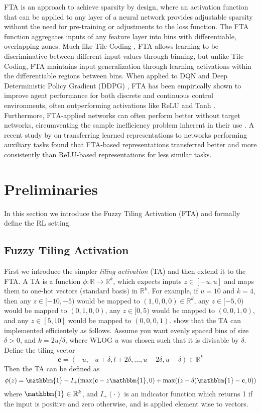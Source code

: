 \documentclass{article}
\newcommand{\RR}{\mathbb{R}}
\begin{document}
FTA is an approach to achieve sparsity by design, 
where an activation function that can be applied to any layer of a neural network provides adjustable sparsity without the need for pre-training or adjustments to the loss function. 
The FTA function aggregates inputs of any feature layer into bins with differentiable, overlapping zones. Much like Tile Coding \cite[]{tilecoding}, 
FTA allows learning to be discriminative between different input values through binning, but unlike Tile Coding, 
FTA maintains input generalization through learning activations within the differentiable regions between bins. 
When applied to DQN and Deep Deterministic Policy Gradient (DDPG) \cite[]{ddpg}, 
FTA has been empirically shown to improve agent performance for both discrete and continuous control environments, 
often outperforming activations like ReLU and Tanh \cite[]{pan2019fuzzy}. Furthermore, FTA-applied networks can often perform better without target networks, 
circumventing the sample inefficiency problem inherent in their use \cite[]{pan2019fuzzy}. 
A recent study by \cite{nnrep} on transferring learned representations to networks performing auxiliary tasks found that FTA-based representations 
transferred better and more consistently than ReLU-based representations for less similar tasks.

\section{Preliminaries} \label{sec:prelims}
In this section we introduce the Fuzzy Tiling Activation (FTA) and formally define the RL setting.

\subsection{Fuzzy Tiling Activation}
First we introduce the simpler \textit{tiling activation} (TA) and then extend it to the FTA.
A TA is a function $\phi: \RR \to \RR^k$, which expects inputs $z \in [-u, u]$ and maps them to one-hot vectors (standard basis) in $\RR^k$.
For example, if $u=10$ and $k=4$, then any $z \in [-10,-5)$ would be mapped to $(1, 0 ,0, 0) \in \RR^k$, any $z \in [-5, 0)$ would be mapped to $(0, 1, 0, 0)$, any $z \in [0, 5)$ would be mapped to $(0, 0, 1, 0)$, and any $z \in [5, 10]$ would be mapped to $(0, 0, 0, 1)$.
\cite{pan2019fuzzy} show that the TA can implemented efficientely as follows.
Assume you want evenly spaced bins of size $\delta > 0$, and $k = 2 u/ \delta$, where WLOG $u$ was chosen such that it is divisable by $\delta$. 
Define the tiling vector 
$$\mathbf{c} = (-u, -u + \delta, l + 2 \delta, \dots, u - 2 \delta, u - \delta) \in \RR^k$$
Then the TA can be defined as
$$\phi(z) = \mathbbm{1} - I_+(\max(\mathbf{c} - z\mathbbm{1}, 0) + \max((z -\delta)\mathbbm{1} - \mathbf{c}, 0))$$
where $\mathbbm{1} \in \RR^k$, and $I_+(\cdot)$ is an indicator function which returns 1 if the input is positive and zero otherwise, and is applied element wise to vectors.
\end{document}
